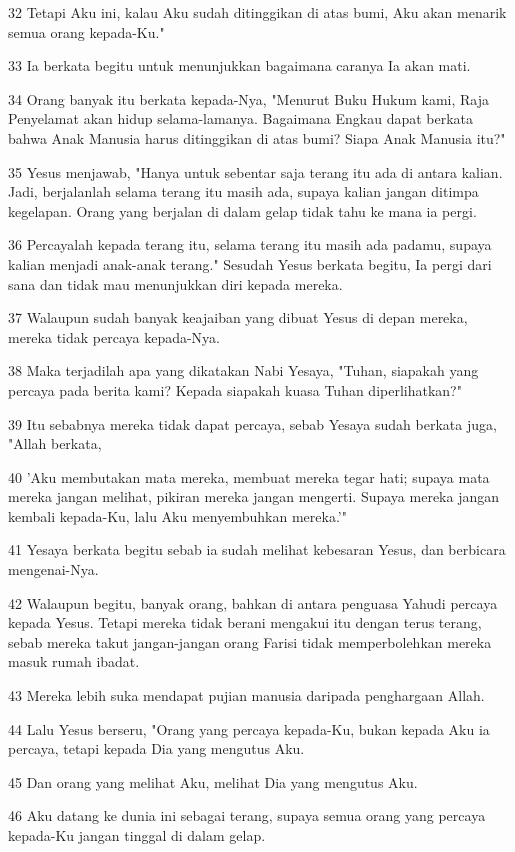 \par 32 Tetapi Aku ini, kalau Aku sudah ditinggikan di atas bumi, Aku akan menarik semua orang kepada-Ku."
\par 33 Ia berkata begitu untuk menunjukkan bagaimana caranya Ia akan mati.
\par 34 Orang banyak itu berkata kepada-Nya, "Menurut Buku Hukum kami, Raja Penyelamat akan hidup selama-lamanya. Bagaimana Engkau dapat berkata bahwa Anak Manusia harus ditinggikan di atas bumi? Siapa Anak Manusia itu?"
\par 35 Yesus menjawab, "Hanya untuk sebentar saja terang itu ada di antara kalian. Jadi, berjalanlah selama terang itu masih ada, supaya kalian jangan ditimpa kegelapan. Orang yang berjalan di dalam gelap tidak tahu ke mana ia pergi.
\par 36 Percayalah kepada terang itu, selama terang itu masih ada padamu, supaya kalian menjadi anak-anak terang." Sesudah Yesus berkata begitu, Ia pergi dari sana dan tidak mau menunjukkan diri kepada mereka.
\par 37 Walaupun sudah banyak keajaiban yang dibuat Yesus di depan mereka, mereka tidak percaya kepada-Nya.
\par 38 Maka terjadilah apa yang dikatakan Nabi Yesaya, "Tuhan, siapakah yang percaya pada berita kami? Kepada siapakah kuasa Tuhan diperlihatkan?"
\par 39 Itu sebabnya mereka tidak dapat percaya, sebab Yesaya sudah berkata juga, "Allah berkata,
\par 40 'Aku membutakan mata mereka, membuat mereka tegar hati; supaya mata mereka jangan melihat, pikiran mereka jangan mengerti. Supaya mereka jangan kembali kepada-Ku, lalu Aku menyembuhkan mereka.'"
\par 41 Yesaya berkata begitu sebab ia sudah melihat kebesaran Yesus, dan berbicara mengenai-Nya.
\par 42 Walaupun begitu, banyak orang, bahkan di antara penguasa Yahudi percaya kepada Yesus. Tetapi mereka tidak berani mengakui itu dengan terus terang, sebab mereka takut jangan-jangan orang Farisi tidak memperbolehkan mereka masuk rumah ibadat.
\par 43 Mereka lebih suka mendapat pujian manusia daripada penghargaan Allah.
\par 44 Lalu Yesus berseru, "Orang yang percaya kepada-Ku, bukan kepada Aku ia percaya, tetapi kepada Dia yang mengutus Aku.
\par 45 Dan orang yang melihat Aku, melihat Dia yang mengutus Aku.
\par 46 Aku datang ke dunia ini sebagai terang, supaya semua orang yang percaya kepada-Ku jangan tinggal di dalam gelap.
